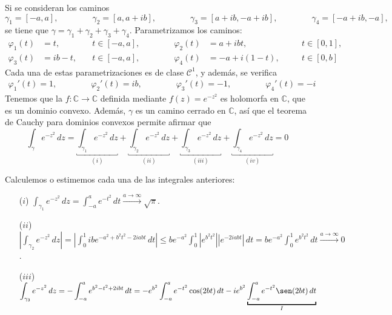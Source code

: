 \documentclass[11pt]{report}
\makeatletter
\renewenvironment{proof}[1][\proofname]{\par
  \pushQED{\qed}%
  \normalfont \topsep\z@skip %
  \trivlist
  \item[\hskip\labelsep
        \itshape
    #1\@addpunct{.}]\ignorespaces
}{%
  \popQED\endtrivlist\@endpefalse
}
\newcommand{\C}{\mathbb C}
\makeatother
\begin{document}
\begin{proof}
Si se consideran los caminos
\[\gamma_1 = [-a,a], \qquad \qquad \gamma_2 = [a,a+ib], \qquad \qquad \gamma_3 = [a+ib,-a+ib], \qquad \qquad \gamma_4 = [-a+ib,-a],\]
se tiene que $\gamma = \gamma_1+\gamma_2+\gamma_3+\gamma_4$. Parametrizamos los caminos:
\[
\begin{alignedat}{4}
\varphi_1(t) &=t, \quad &t\in [-a,a], \qquad \qquad \varphi_2(t) &=a+ibt, \quad &&t\in [0,1], \\
\varphi_3(t) &=ib-t, \quad &t\in [-a,a], \qquad \qquad \varphi_4(t)&=-a+i(1-t), \quad &&t \in [0,b]
\end{alignedat}
\]
Cada una de estas parametrizaciones es de clase $\mathcal{C}^1$, y además, se verifica
\[\begin{alignedat}{2} \varphi_1'(t) = 1, \qquad \qquad \varphi_2'(t) = ib, \qquad \qquad \varphi_3'(t) = -1, \qquad \qquad \varphi_4'(t) = -i
\end{alignedat}\]
Tenemos que la $f \colon \C \to \C$ definida mediante $f(z) =e^{-z^2}$ es holomorfa en $\C$, que es un dominio convexo. Además, $\gamma$ es un camino cerrado en $\C$, así que el teorema de Cauchy para dominios convexos permite afirmar que
\[\int_{\gamma} e^{-z^2} \, dz = \underbracket{\int_{\gamma_1}e^{-z^2} \, dz}_{(i)}+ \underbracket{\int_{\gamma_2}e^{-z^2} \, dz}_{(ii)} +\underbracket{\int_{\gamma_3}e^{-z^2} \, dz}_{(iii)} +\underbracket{\int_{\gamma_4}e^{-z^2} \, dz}_{(iv)} = 0 \tag{$*$}\]

\pagebreak

Calculemos o estimemos cada una de las integrales anteriores:
\begin{itemize}
    \item[($i$)] $\displaystyle \int_{\gamma_1} e^{-z^2} \, dz = \int_{-a}^a e^{-t^2} \, dt \xrightarrow[]{a \to \infty} \sqrt{\pi}$.
    \item[($ii$)] $\displaystyle \left|\int_{\gamma_2} e^{-z^2} \, dz\right| = \left| \int_0^1ibe^{-a^2+b^2t^2-2iabt} \, dt\right|  \leq be^{-a^2}\int_0^1 |e^{b^2t^2}||e^{-2iabt}| \, dt = be^{-a^2}\int_0^1 e^{b^2t^2} \, dt \xrightarrow[]{a\to \infty} 0$.
    \item[($iii$)] $\displaystyle \begin{aligned}[t]
        \int_{\gamma_3} e^{-z^2} \, dz &= -\int_{-a}^ae^{b^2-t^2+2ibt} \, dt = -e^{b^2}\int_{-a}^ae^{-t^2}\cos(2bt) \, dt -ie^{b^2}\underbracket{\int_{-a}^ae^{-t^2}\sen(2bt) \, dt}_{I}
    \end{aligned}$


\end{itemize}
\end{proof}
\end{document}
